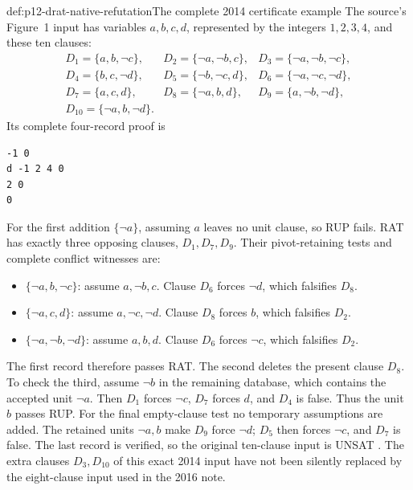 \begin{hbexample}{def:p12-drat-native-refutation}{The complete 2014 certificate example}
The source's Figure~1 input has variables \(a,b,c,d\), represented by the
integers \(1,2,3,4\), and these ten clauses:
\[
\begin{array}{lll}
 D_1=\{a,b,\neg c\},&D_2=\{\neg a,\neg b,c\},&D_3=\{\neg a,\neg b,\neg c\},\\
 D_4=\{b,c,\neg d\},&D_5=\{\neg b,\neg c,d\},&D_6=\{\neg a,\neg c,\neg d\},\\
 D_7=\{a,c,d\},&D_8=\{\neg a,b,d\},&D_9=\{a,\neg b,\neg d\},\\
 D_{10}=\{\neg a,b,\neg d\}.&&
\end{array}
\]
Its complete four-record proof is
\begin{verbatim}
-1 0
d -1 2 4 0
2 0
0
\end{verbatim}
For the first addition \(\{\neg a\}\), assuming \(a\) leaves no unit
clause, so RUP fails.  RAT has exactly three opposing clauses, \(D_1,D_7,D_9\).
Their pivot-retaining tests and complete conflict witnesses are:
\begin{itemize}
 \item \(\{\neg a,b,\neg c\}\): assume \(a,\neg b,c\).
       Clause \(D_6\) forces \(\neg d\), which falsifies \(D_8\).
 \item \(\{\neg a,c,d\}\): assume \(a,\neg c,\neg d\).
       Clause \(D_8\) forces \(b\), which falsifies \(D_2\).
 \item \(\{\neg a,\neg b,\neg d\}\): assume \(a,b,d\).
       Clause \(D_6\) forces \(\neg c\), which falsifies \(D_2\).
\end{itemize}
The first record therefore passes RAT.  The second deletes the present clause
\(D_8\).  To check the third, assume \(\neg b\) in the remaining
database, which contains the accepted unit \(\neg a\).  Then \(D_1\)
forces \(\neg c\), \(D_7\) forces \(d\), and \(D_4\) is false.
Thus the unit \(b\) passes RUP.  For the final empty-clause test no temporary
assumptions are added.  The retained units \(\neg a,b\) make \(D_9\)
force \(\neg d\); \(D_5\) then forces \(\neg c\), and \(D_7\)
is false.  The last record is verified, so the original ten-clause input is
UNSAT \cite[Fig.~1]{WetzlerHeuleHunt2014AuthorDRAT}.
The extra clauses \(D_3,D_{10}\) of this exact 2014 input have not been
silently replaced by the eight-clause input used in the 2016 note.
\end{hbexample}

